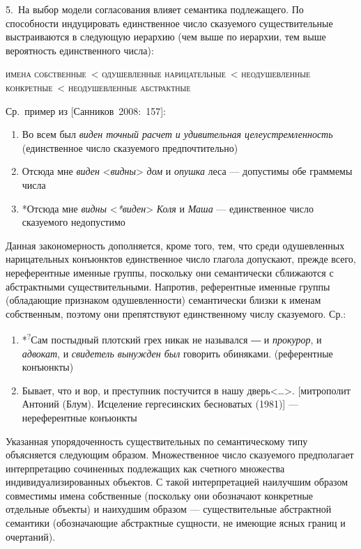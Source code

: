 5.~На выбор модели согласования влияет семантика подлежащего. По
способности индуцировать единственное число сказуемого существительные
выстраиваются в следующую иерархию (чем выше по иерархии, тем выше
вероятность единственного числа):

\textsc{имена собственные~\textless{} одушевленные
нарицательные~\textless{} неодушевленные конкретные~\textless{}
неодушевленные абстрактные}

Ср.~пример из {[}Санников~2008:~157{]}:

\begin{enumerate}
\def\labelenumi{(\arabic{enumi})}
\setcounter{enumi}{117}
\item
  Во всем был \textit{виден точный расчет и удивительная
  целеустремленность} (единственное число сказуемого предпочтительно)
\item
  Отсюда мне \textit{виден} \textless{}\textit{видны}\textgreater{}
  \textit{дом} и \textit{опушка} леса --- допустимы обе граммемы числа
\item
  *Отсюда мне \textit{видны} \textless{}\textit{*виден}\textgreater{}
  \textit{Коля} и \textit{Маша} --- единственное число сказуемого недопустимо
\end{enumerate}

Данная закономерность дополняется, кроме того, тем, что среди
одушевленных нарицательных конъюнктов единственное число глагола
допускают, прежде всего, нереферентные именные группы, поскольку они
семантически сближаются с абстрактными существительными. Напротив,
референтные именные группы (обладающие признаком одушевленности)
семантически близки к именам собственным, поэтому они препятствуют
единственному числу сказуемого. Ср.:

\begin{enumerate}
\def\labelenumi{(\arabic{enumi})}
\setcounter{enumi}{120}
\item
  *\textsuperscript{?}Сам постыдный плотский грех никак не назывался ― и
  \textit{прокурор}, и \textit{адвокат}, и \textit{свидетель вынужден был}
  говорить обиняками. (референтные конъюнкты)
\item
  Бывает, что и вор, и преступник постучится в нашу
  дверь\textless\ldots\textgreater. {[}митрополит Антоний (Блум).
  Исцеление гергесинских бесноватых (1981){]} --- нереферентные конъюнкты
\end{enumerate}

Указанная упорядоченность существительных по семантическому типу
объясняется следующим образом. Множественное число сказуемого
предполагает интерпретацию сочиненных подлежащих как счетного множества
индивидуализированных объектов. С такой интерпретацией наилучшим образом
совместимы имена собственные (поскольку они обозначают конкретные
отдельные объекты) и наихудшим образом --- существительные абстрактной
семантики (обозначающие абстрактные сущности, не имеющие ясных границ и
очертаний).

